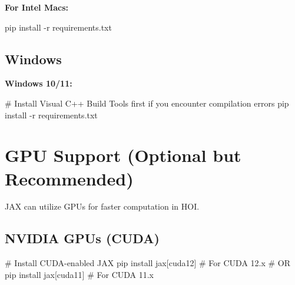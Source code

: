 \documentclass[
  11pt,
  letterpaper,
  oneside,
  openany]{book}
\newenvironment{Shaded}{\begin{snugshade}}{\end{snugshade}}
\newcommand{\AttributeTok}[1]{\textcolor[rgb]{0.40,0.45,0.13}{#1}}
\newcommand{\CommentTok}[1]{\textcolor[rgb]{0.37,0.37,0.37}{#1}}
\newcommand{\ExtensionTok}[1]{\textcolor[rgb]{0.00,0.23,0.31}{#1}}
\newcommand{\NormalTok}[1]{\textcolor[rgb]{0.00,0.23,0.31}{#1}}
\newcommand{\PreprocessorTok}[1]{\textcolor[rgb]{0.68,0.00,0.00}{#1}}
\newcommand{\SpecialStringTok}[1]{\textcolor[rgb]{0.13,0.47,0.30}{#1}}
\begin{document}
\textbf{For Intel Macs:}

\begin{Shaded}
\begin{Highlighting}[]
\ExtensionTok{pip}\NormalTok{ install }\AttributeTok{{-}r}\NormalTok{ requirements.txt}
\end{Highlighting}
\end{Shaded}

\subsection*{Windows}\label{windows}

\textbf{Windows 10/11:}

\begin{Shaded}
\begin{Highlighting}[]
\CommentTok{\# Install Visual C++ Build Tools first if you encounter compilation errors}
\ExtensionTok{pip}\NormalTok{ install }\AttributeTok{{-}r}\NormalTok{ requirements.txt}
\end{Highlighting}
\end{Shaded}

\section*{GPU Support (Optional but
Recommended)}\label{gpu-support-optional-but-recommended}


JAX can utilize GPUs for faster computation in HOI.

\subsection*{NVIDIA GPUs (CUDA)}\label{nvidia-gpus-cuda}

\begin{Shaded}
\begin{Highlighting}[]
\CommentTok{\# Install CUDA{-}enabled JAX}
\ExtensionTok{pip}\NormalTok{ install jax}\PreprocessorTok{[}\SpecialStringTok{cuda12}\PreprocessorTok{]}  \CommentTok{\# For CUDA 12.x}
\CommentTok{\# OR}
\ExtensionTok{pip}\NormalTok{ install jax}\PreprocessorTok{[}\SpecialStringTok{cuda11}\PreprocessorTok{]}  \CommentTok{\# For CUDA 11.x}
\end{Highlighting}
\end{Shaded}
\end{document}
